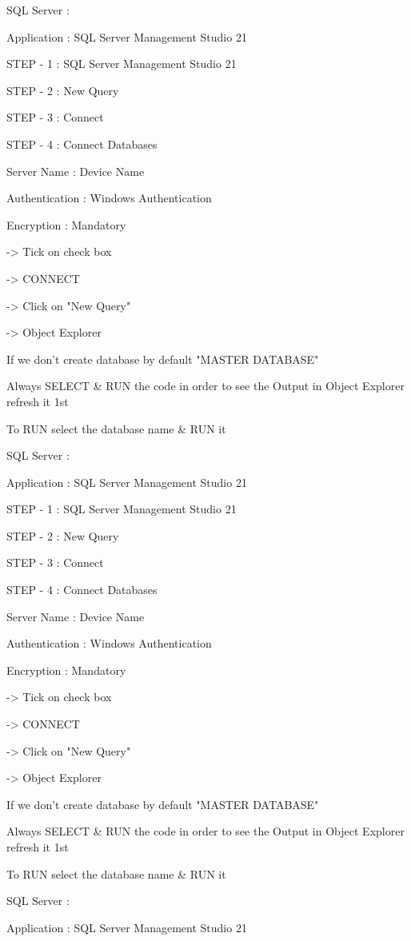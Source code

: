 SQL Server :

Application : SQL Server Management Studio 21

STEP - 1 : SQL Server Management Studio 21

STEP - 2 : New Query

STEP - 3 : Connect

STEP - 4 : Connect Databases


Server Name : Device Name

Authentication : Windows Authentication

Encryption : Mandatory

-> Tick on check box

-> CONNECT

-> Click on "New Query"

-> Object Explorer


If we don't create database by default "MASTER DATABASE"


Always SELECT & RUN the code in order to see the Output in Object Explorer refresh it 1st


To RUN select the database name & RUN it

SQL Server :

Application : SQL Server Management Studio 21

STEP - 1 : SQL Server Management Studio 21

STEP - 2 : New Query

STEP - 3 : Connect

STEP - 4 : Connect Databases


Server Name : Device Name

Authentication : Windows Authentication

Encryption : Mandatory

-> Tick on check box

-> CONNECT

-> Click on "New Query"

-> Object Explorer


If we don't create database by default "MASTER DATABASE"


Always SELECT & RUN the code in order to see the Output in Object Explorer refresh it 1st


To RUN select the database name & RUN it

SQL Server :

Application : SQL Server Management Studio 21

